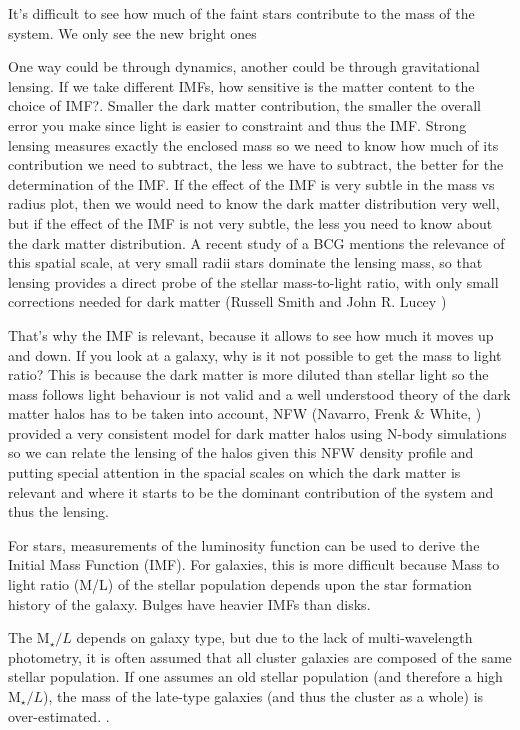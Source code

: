 It's difficult to see how much of the faint stars contribute to the mass of the system. We only see the new bright ones

One way could be through dynamics, another could be through gravitational lensing. If we take different IMFs, how sensitive is the matter content to the choice of IMF?. Smaller the dark matter contribution, the smaller the overall error you make since light is easier to constraint and thus the IMF. Strong lensing measures exactly the enclosed mass so we need to know how much of its contribution we need to subtract, the less we have to subtract, the better for the determination of the IMF. If the effect of the IMF is very subtle in the mass vs radius plot, then we would need to know the dark matter distribution very well, but if the effect of the IMF is not very subtle, the less you need to know about the dark matter distribution. A recent study of a BCG mentions the relevance of this spatial scale, at very small radii stars dominate the lensing mass, so that lensing provides a direct probe of the stellar mass-to-light ratio, with only small corrections needed for dark matter (Russell Smith and John R. Lucey \citeyear{Reference7}) 

That's why the IMF is relevant, because it allows to see how much it moves up and down. If you look at a galaxy, why is it not possible to get the mass to light ratio? This is because the dark matter is more diluted than stellar light so the mass follows light behaviour is not valid and a well understood theory of the dark matter halos has to be taken into account, NFW (Navarro, Frenk \& White, \citeyear{Reference17}) provided a very consistent model for dark matter halos using N-body simulations so we can relate the lensing of the halos given this NFW density profile and putting special attention in the spacial scales on which the dark matter is relevant and where it starts to be the dominant contribution of the system and thus the lensing.

For stars, measurements of the luminosity function can be used to derive the Initial Mass Function (IMF). For galaxies, this is more difficult because Mass to light ratio (M/L) of the stellar population depends upon the star formation history of the galaxy. Bulges have heavier IMFs than disks.

The $\text{M}_{\star}/L$ depends on galaxy type, but due to the lack of multi-wavelength photometry, it is often assumed that all cluster galaxies are composed of the same stellar population. If one assumes an old stellar population (and therefore a high $\text{M}_{\star}/L$), the mass of the late-type galaxies (and thus the cluster as a whole) is over-estimated. \citeyear{Reference2}.

